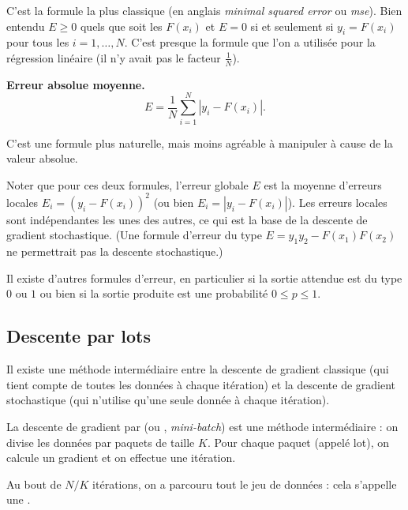 \documentclass[11pt,class=report,crop=false]{standalone}
\begin{document}
C'est la formule la plus classique (en anglais \emph{minimal squared error} ou \emph{mse}). 
Bien entendu $E\ge0$ quels que soit les $F(x_i)$ et $E=0$ si et seulement si $y_i=F(x_i)$ pour tous les $i=1,\ldots,N$. 
C'est presque la formule que l'on a utilisée pour la régression linéaire (il n'y avait pas le facteur $\frac1N$).

\textbf{Erreur absolue moyenne.}
$$E = \frac{1}{N} \sum_{i=1}^N |y_i-F(x_i)|.$$

C'est une formule plus naturelle, mais moins agréable à manipuler à cause de la valeur absolue.

Noter que pour ces deux formules, l'erreur globale $E$ est la moyenne d'erreurs locales $E_i = (y_i-F(x_i))^2$ (ou bien $E_i = |y_i-F(x_i)|$).
Les erreurs locales sont indépendantes les unes des autres, ce qui est la base de la descente de gradient stochastique.
(Une formule d'erreur du type $E = y_1y_2 - F(x_1)F(x_2)$ ne permettrait pas la descente stochastique.)

Il existe d'autres formules d'erreur, en particulier si la sortie attendue est du type $0$ ou $1$ ou bien si la sortie produite est une probabilité $0\le p \le 1$. 


\subsection{Descente par lots}
\label{ssec:lot}


Il existe une méthode intermédiaire entre la descente de gradient classique (qui tient compte de toutes les données à chaque itération)
et la descente de gradient stochastique (qui n'utilise qu'une seule donnée à chaque itération).

La descente de gradient par  (ou , \emph{mini-batch}) est une méthode intermédiaire : on divise les données par paquets de taille $K$. Pour chaque paquet (appelé \og{}lot\fg{}), on calcule un gradient et on effectue une itération.

Au bout de $N/K$ itérations, on a parcouru tout le jeu de données : cela s'appelle une .


\end{document}
